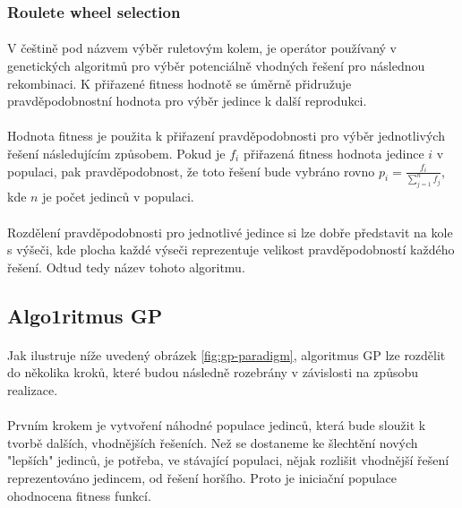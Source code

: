\documentclass[bc,male,java,dept460]{diploma}		%
\begin{document}
\subsubsection*{Roulete wheel selection}
\paragraph*{}
V češtině pod názvem výběr ruletovým kolem, je operátor používaný v genetických algoritmů pro výběr potenciálně vhodných řešení pro následnou rekombinaci. K přiřazené fitness hodnotě se úměrně přidružuje pravděpodobnostní hodnota pro výběr jedince k další reprodukci. 

\paragraph*{}
Hodnota fitness je použita k přiřazení pravděpodobnosti pro výběr jednotlivých řešení následujícím způsobem. Pokud je $f_i$ přiřazená fitness hodnota jedince $i$ v populaci, pak pravděpodobnost, že toto řešení bude vybráno rovno $p_i=\frac{f_i}{\sum\limits_{j=1}^n f_j}$, kde $n$ je počet jedinců v populaci.

\paragraph*{}
Rozdělení pravděpodobnosti pro jednotlivé jedince si lze dobře představit na kole s výšeči, kde plocha každé výseči reprezentuje velikost pravděpodobností každého řešení. Odtud tedy název tohoto algoritmu.


\subsection{Algo1ritmus GP}
\paragraph*{}
Jak ilustruje níže uvedený obrázek \ref{fig:gp-paradigm}, algoritmus GP lze rozdělit do několika kroků, které budou následně rozebrány v závislosti na způsobu realizace.

\paragraph*{}
Prvním krokem je vytvoření náhodné populace jedinců, která bude sloužit k tvorbě dalších, vhodnějších řešeních.
Než se dostaneme ke šlechtění nových "lepších" jedinců, je potřeba, ve stávající populaci, nějak rozlišit vhodnější řešení reprezentováno jedincem, od řešení horšího. Proto je iniciační populace ohodnocena fitness funkcí.
\end{document}

